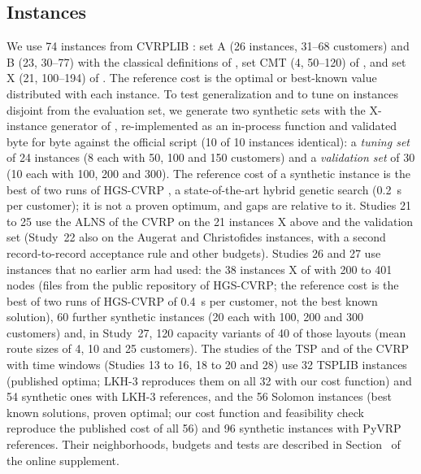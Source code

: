 \subsection{Instances}
We use 74 instances from CVRPLIB \citep{cvrplib}: set A (26 instances, 31--68 customers) and B (23, 30--77) with the classical definitions of \citet{augerat1995}, set CMT (4, 50--120) of \citet{christofides1979}, and set X (21, 100--194) of \citet{uchoa2017}. The reference cost is the optimal or best-known value distributed with each instance. To test generalization and to tune on instances disjoint from the evaluation set, we generate two synthetic sets with the X-instance generator of \citet{uchoa2017}, re-implemented as an in-process function and validated byte for byte against the official script (10 of 10 instances identical): a \emph{tuning set} of 24 instances (8 each with 50, 100 and 150 customers) and a \emph{validation set} of 30 (10 each with 100, 200 and 300). The reference cost of a synthetic instance is the best of two runs of HGS-CVRP \citep{vidal2022}, a state-of-the-art hybrid genetic search (0.2~s per customer); it is not a proven optimum, and gaps are relative to it. Studies 21 to 25 use the ALNS of the CVRP on the 21 instances X above and the validation set (Study~22 also on the Augerat and Christofides instances, with a second record-to-record acceptance rule and other budgets). Studies 26 and 27 use instances that no earlier arm had used: the 38 instances X of \citet{uchoa2017} with 200 to 401 nodes (files from the public repository of HGS-CVRP; the reference cost is the best of two runs of HGS-CVRP of 0.4~s per customer, not the best known solution), 60 further synthetic instances (20 each with 100, 200 and 300 customers) and, in Study~27, 120 capacity variants of 40 of those layouts (mean route sizes of 4, 10 and 25 customers). The studies of the TSP and of the CVRP with time windows (Studies 13 to 16, 18 to 20 and 28) use 32 TSPLIB instances \citep{reinelt1991} (published optima; LKH-3 \citep{helsgaun2000} reproduces them on all 32 with our cost function) and 54 synthetic ones with LKH-3 references, and the 56 Solomon instances \citep{solomon1987} (best known solutions, proven optimal; our cost function and feasibility check reproduce the published cost of all 56) and 96 synthetic instances with PyVRP \citep{wouda2024} references. Their neighborhoods, budgets and tests are described in Section~ of the online supplement.

